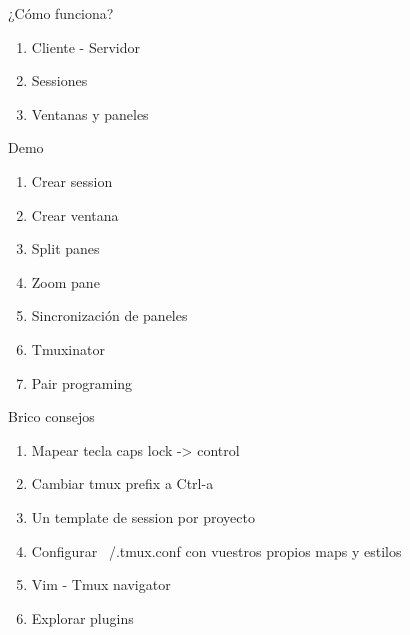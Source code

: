 \documentclass{beamer}
\begin{document}
\begin{frame}{¿Cómo funciona?}
  \begin{enumerate}
  \item Cliente - Servidor
  \item Sessiones
  \item Ventanas y paneles
  \end{enumerate}
\end{frame}

\begin{frame}{Demo}
  \begin{enumerate}
  \item Crear session
  \item Crear ventana
  \item Split panes
  \item Zoom pane
  \item Sincronización de paneles
  \item Tmuxinator
  \item Pair programing
  \end{enumerate}
\end{frame}

\begin{frame}{Brico consejos}
  \begin{enumerate}
  \item Mapear tecla caps lock -> control
  \item Cambiar tmux prefix a Ctrl-a
  \item Un template de session por proyecto
  \item Configurar ~/.tmux.conf con vuestros propios maps y estilos
  \item Vim - Tmux navigator
  \item Explorar plugins
  \end{enumerate}
\end{frame}
\end{document}
